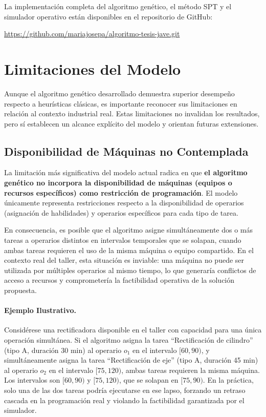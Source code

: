 La implementación completa del algoritmo genético, el método SPT y el simulador operativo están disponibles en el repositorio de GitHub:

\begin{center}
\url{https://github.com/mariajosepa/algoritmo-tesis-jave.git}
\end{center}

\section{Limitaciones del Modelo}

Aunque el algoritmo genético desarrollado demuestra superior desempeño respecto a heurísticas clásicas, es importante reconocer sus limitaciones en relación al contexto industrial real. Estas limitaciones no invalidan los resultados, pero sí establecen un alcance explícito del modelo y orientan futuras extensiones.

\subsection{Disponibilidad de Máquinas no Contemplada}

La limitación más significativa del modelo actual radica en que \textbf{el algoritmo genético no incorpora la disponibilidad de máquinas (equipos o recursos específicos) como restricción de programación}. El modelo únicamente representa restricciones respecto a la disponibilidad de operarios (asignación de habilidades) y operarios específicos para cada tipo de tarea.

En consecuencia, es posible que el algoritmo asigne simultáneamente dos o más tareas a operarios distintos en intervalos temporales que se solapan, cuando ambas tareas requieren el uso de la misma máquina o equipo compartido. En el contexto real del taller, esta situación es inviable: una máquina no puede ser utilizada por múltiples operarios al mismo tiempo, lo que generaría conflictos de acceso a recursos y comprometería la factibilidad operativa de la solución propuesta.

\paragraph{Ejemplo Ilustrativo.} Considérese una rectificadora disponible en el taller con capacidad para una única operación simultánea. Si el algoritmo asigna la tarea ``Rectificación de cilindro'' (tipo A, duración 30 min) al operario $o_1$ en el intervalo $[60, 90)$, y simultáneamente asigna la tarea ``Rectificación de eje'' (tipo A, duración 45 min) al operario $o_2$ en el intervalo $[75, 120)$, ambas tareas requieren la misma máquina. Los intervalos son $[60,90)$ y $[75,120)$, que se solapan en $[75,90)$. En la práctica, solo una de las dos tareas podría ejecutarse en ese lapso, forzando un retraso cascada en la programación real y violando la factibilidad garantizada por el simulador.

